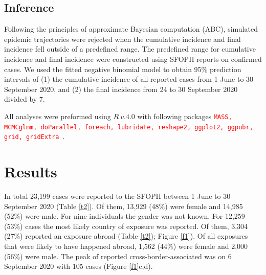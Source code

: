 \documentclass[10pt, a4paper, twoside]{article}
\begin{document}
\begin{multicols}{2}
\subsection{Inference}
Following the principles of approximate Bayesian computation (ABC), simulated epidemic trajectories were rejected when the cumulative incidence and final incidence fell outside of a predefined range.%
The predefined range for cumulative incidence and final incidence were constructed using SFOPH reports on confirmed cases.
We used the fitted negative binomial model to obtain 95\% prediction intervals of (1) the cumulative incidence of all reported cases from 1 June to 30 September 2020, and (2) the final incidence from 24 to 30 September 2020 divided by 7.


All analyses were preformed using $R ~v.4.0$ with following packages \textcolor{red}{\texttt{MASS, MCMCglmm, doParallel, foreach, lubridate, reshape2, ggplot2, ggpubr, grid, gridExtra }}.\cite{r_core_team_r_2020,venables_modern_2002}

\section{Results}
In total 23,199 cases were reported to the SFOPH between 1 June to 30 September 2020 (Table \ref{t2}). 
Of them, 13,929 (48\%) were female and 14,985 (52\%) were male.
For nine individuals the gender was not known.
For 12,259 (53\%) cases the most likely country of exposure was reported.
Of them, 3,304 (27\%) reported an exposure abroad (Table \ref{t2}); Figure \ref{f1}).
Of all exposures that were likely to have happened abroad, 1,562 (44\%) were female and 2,000 (56\%) were male.
The peak of reported cross-border-associated was on 6 September 2020 with 105 cases (Figure \ref{f1}c,d).

\end{multicols}
\end{document}
